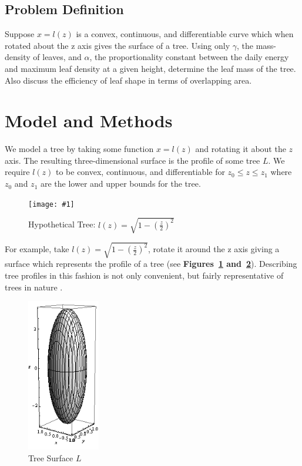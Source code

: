 \documentclass[10pt]{article}
\numberwithin{equation}{subsection}
\newlength{\imgwidth}
\newcommand{\scalegraphics}[1]{%
    \settowidth{\imgwidth}{\texttt{[image: \#1]}}%
    \setlength{\imgwidth}{\minof{\imgwidth}{\columnwidth}}%
    \texttt{[image: \#1]}%
}
\begin{document}
\subsection{Problem Definition}
Suppose $x = l(z)$ is a convex, continuous, and differentiable curve
which when rotated about the z axis gives the surface of a tree. Using
only $\gamma$, the mass-density of leaves, and $\alpha$, the
proportionality constant between the daily energy and maximum leaf
density at a given height, determine the leaf mass of the tree. Also
discuss the efficiency of leaf shape in terms of overlapping area.

\section{Model and Methods}

We model a tree by taking some function $x = l(z)$ and rotating it
about the $z$ axis. The resulting three-dimensional surface is the
profile of some tree $L$. We require $l(z)$ to be convex, continuous,
and differentiable for $z_0 \le z \le z_1$ where $z_0$ and $z_1$ are
the lower and upper bounds for the tree. \\

\begin{figure}[h!]
  \caption{Hypothetical Tree: $l(z)=\sqrt{1-(\frac{z}{2})^2}$}
  \centering
  \scalegraphics{img/lz.png}
  \label{fig:l(z)}
\end{figure}

For example,  take $l(z) = \sqrt{1-(\frac{z}{2})^2}$, rotate it around
the z axis giving a surface which represents the profile of a tree
(see {\bf Figures~\ref{fig:l(z)} and~\ref{fig:L}}). Describing tree
profiles in this fashion is not only convenient, but fairly
representative of trees in nature \citep{treeSymm01}. 

\begin{figure}[h!]
  \centering
  \includegraphics[width=120px]{img/L.png}
  \caption{Tree Surface $L$}
  \label{fig:L}
\end{figure}
\end{document}
